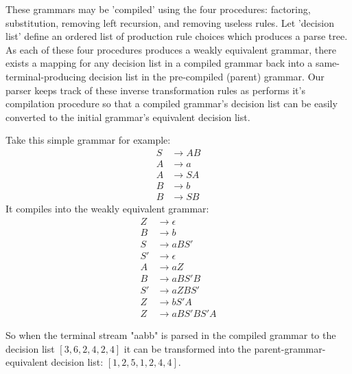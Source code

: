 \documentclass[11pt]{article}
\begin{document}
These grammars may be 'compiled' using the four procedures:
factoring, substitution, removing left recursion, and removing useless
rules. Let 'decision list' define an ordered list of production rule
choices which produces a parse tree.
As each of these four procedures produces a weakly equivalent grammar,
there exists a mapping for any decision list in a compiled grammar
back into a same-terminal-producing decision list in the pre-compiled (parent) grammar.
Our parser keeps track of these inverse transformation rules as performs
it's compilation procedure so that a compiled grammar's decision list can be easily
converted to the initial grammar's equivalent decision list. 

Take this simple grammar for example:
\setcounter{equation}{0}
\begin{align}
S &\rightarrow A B\\
A &\rightarrow a\\
A &\rightarrow S A\\
B &\rightarrow b\\
B &\rightarrow S B
\end{align}
It compiles into the weakly equivalent grammar:
\setcounter{equation}{0}
\begin{align}
Z &\rightarrow \epsilon\\
B &\rightarrow b\\
S &\rightarrow a B S'\\
S' &\rightarrow \epsilon\\
A &\rightarrow a Z\\
B &\rightarrow a B S' B\\
S' &\rightarrow a Z B S'\\
Z &\rightarrow b S' A\\
Z &\rightarrow a B S' B S' A
\end{align}

So when the terminal stream "aabb" is parsed in the compiled
grammar to the decision list $[3, 6, 2, 4, 2, 4]$ it can be transformed
into the parent-grammar-equivalent decision list: $[1, 2, 5, 1, 2, 4, 4]$.
\end{document}

